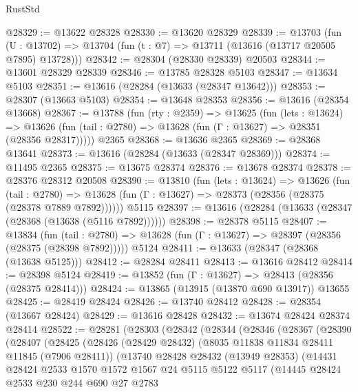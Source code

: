 \begin{lexlean}{RustStd}
\begin{coremodule}
@28329 := @13622 @28328
@28330 := @13620 @28329
@28339 := @13703
    (fun (U : @13702) => @13704 (fun (t : @7) => @13711 (@13616 (@13717 @20505 @7895) @13728)))
@28342 := @28304 (@28330 @28339) @20503
@28344 := @13601 @28329 @28339
@28346 := @13785 @28328 @5103
@28347 := @13634 @5103
@28351 := @13616 (@28284 (@13633 (@28347 @13642)))
@28353 := @28307 (@13663 @5103)
@28354 := @13648 @28353
@28356 := @13616 (@28354 @13668)
@28367 := @13788
    (fun (rty : @2359) =>
    @13625
      (fun (lets : @13624) =>
      @13626 (fun (tail : @2780) => @13628 (fun (Γ : @13627) => @28351 (@28356 @28317)))))
    @2365
@28368 := @13636 @2365
@28369 := @28368 @13641
@28373 := @13616 (@28284 (@13633 (@28347 @28369)))
@28374 := @11495 @2365
@28375 := @13675 @28374
@28376 := @13678 @28374
@28378 := @28376 @28312 @20508
@28390 := @13810
    (fun (lets : @13624) =>
    @13626
      (fun (tail : @2780) =>
      @13628 (fun (Γ : @13627) => @28373 (@28356 (@28375 (@28378 @7889 @7892))))))
    @5115
@28397 := @13616 (@28284 (@13633 (@28347 (@28368 (@13638 (@5116 @7892))))))
@28398 := @28378 @5115
@28407 := @13834
    (fun (tail : @2780) => @13628 (fun (Γ : @13627) => @28397 (@28356 (@28375 (@28398 @7892)))))
    @5124
@28411 := @13633 (@28347 (@28368 (@13638 @5125)))
@28412 := @28284 @28411
@28413 := @13616 @28412
@28414 := @28398 @5124
@28419 := @13852 (fun (Γ : @13627) => @28413 (@28356 (@28375 @28414)))
@28424 := @13865 (@13915 (@13870 @690 @13917)) @13655
@28425 := @28419 @28424
@28426 := @13740 @28412
@28428 := @28354 (@13667 @28424)
@28429 := @13616 @28428
@28432 := @13674 @28424 @28374 @28414
@28522 := @28281
    (@28303
      (@28342
        (@28344
          (@28346
            (@28367
              (@28390
                (@28407
                  (@28425
                    (@28426
                      (@28429 @28432)
                      (@8035 @11838 @11834 @28411 @11845 (@7906 @28411))
                      (@13740
                        @28428
                        @28432
                        (@13949 @28353)
                        (@14431
                          @28424
                          @2533
                          @1570
                          @1572
                          @1567
                          @24
                          @5115
                          @5122
                          @5117
                          (@14445
                            @28424
                            @2533
                            @230
                            @244
                            @690
                            @27
                            @2783

\end{coremodule}
\end{lexlean}

